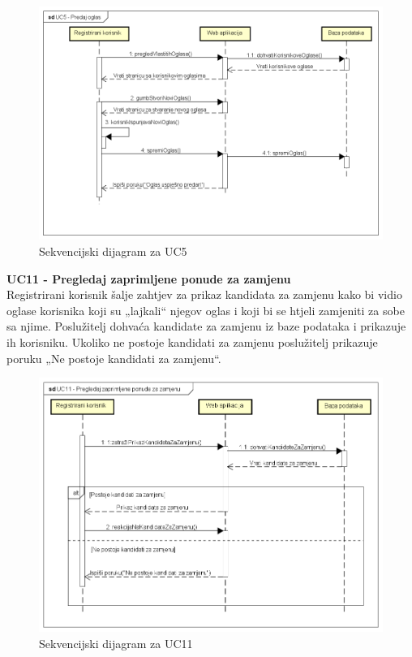 	
	\begin{figure}[H]
		\includegraphics[width=.9\linewidth]{slike/UC5_sekvencijski_dijagram.PNG} %
		\centering
		\caption{Sekvencijski dijagram za UC5}
		\label{fig:sekvdij} %
	\end{figure}

\eject
	
	\textbf{UC11 - Pregledaj zaprimljene ponude za zamjenu}
		\textit\\
		Registrirani korisnik šalje zahtjev za prikaz kandidata za zamjenu kako bi vidio oglase korisnika koji su  „lajkali“ njegov oglas i koji bi se htjeli zamjeniti za sobe sa njime. Poslužitelj dohvaća kandidate za zamjenu iz baze podataka i prikazuje ih korisniku. Ukoliko ne postoje kandidati za zamjenu poslužitelj prikazuje poruku  „Ne postoje kandidati za zamjenu“.  
		
	
	\begin{figure}[H]
		\includegraphics[width=.9\linewidth]{slike/UC11_sekvencijski_dijagram.PNG} %
		\centering
		\caption{Sekvencijski dijagram za UC11}
		\label{fig:sekvdij1} %
	\end{figure}


